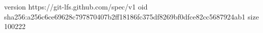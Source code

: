 version https://git-lfs.github.com/spec/v1
oid sha256:a256c6ce69628c797870407b2ff18186fc375df8269bf0dfce82cc5687924ab1
size 100222
